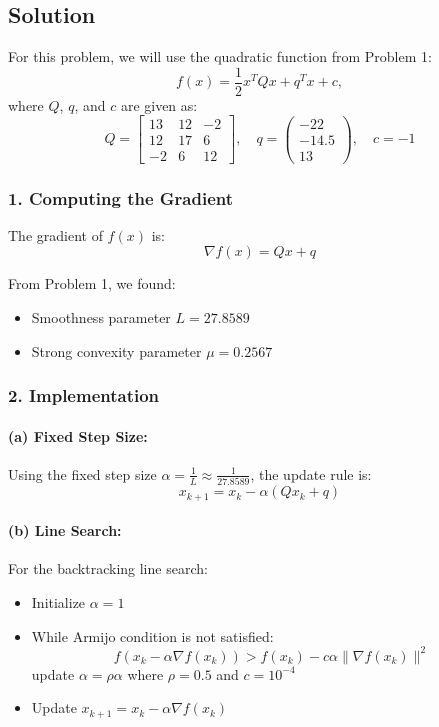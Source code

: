 \documentclass{article}
\begin{document}
\subsection*{Solution}

For this problem, we will use the quadratic function from Problem 1:
\[
f(x) = \frac{1}{2}x^TQx + q^Tx + c,
\]
where $Q$, $q$, and $c$ are given as:
\[
Q = \begin{bmatrix}
13 & 12 & -2 \\
12 & 17 & 6 \\
-2 & 6 & 12
\end{bmatrix}, \quad
q = \begin{pmatrix}
-22 \\
-14.5 \\
13
\end{pmatrix}, \quad
c = -1
\]

\subsubsection*{1. Computing the Gradient}

The gradient of $f(x)$ is:
\[\nabla f(x) = Qx + q\]

From Problem 1, we found:
\begin{itemize}
\item Smoothness parameter $L = 27.8589$
\item Strong convexity parameter $\mu = 0.2567$
\end{itemize}

\subsubsection*{2. Implementation}

\paragraph{(a) Fixed Step Size:}
Using the fixed step size $\alpha = \frac{1}{L} \approx \frac{1}{27.8589}$, the update rule is:
\[x_{k+1} = x_k - \alpha(Qx_k + q)\]

\paragraph{(b) Line Search:}
For the backtracking line search:
\begin{itemize}
\item Initialize $\alpha = 1$
\item While Armijo condition is not satisfied:
\[f(x_k - \alpha \nabla f(x_k)) > f(x_k) - c\alpha\|\nabla f(x_k)\|^2\]
update $\alpha = \rho\alpha$ where $\rho = 0.5$ and $c = 10^{-4}$
\item Update $x_{k+1} = x_k - \alpha \nabla f(x_k)$
\end{itemize}
\end{document}
